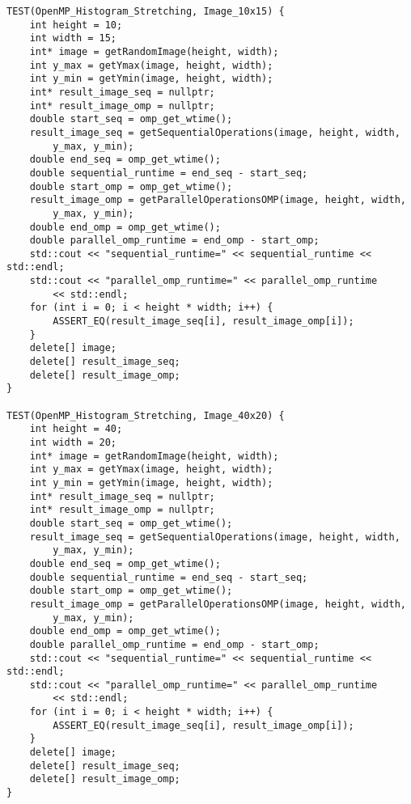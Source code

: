 \documentclass{report}
\begin{document}
\begin{lstlisting}
TEST(OpenMP_Histogram_Stretching, Image_10x15) {
    int height = 10;
    int width = 15;
    int* image = getRandomImage(height, width);
    int y_max = getYmax(image, height, width);
    int y_min = getYmin(image, height, width);
    int* result_image_seq = nullptr;
    int* result_image_omp = nullptr;
    double start_seq = omp_get_wtime();
    result_image_seq = getSequentialOperations(image, height, width,
        y_max, y_min);
    double end_seq = omp_get_wtime();
    double sequential_runtime = end_seq - start_seq;
    double start_omp = omp_get_wtime();
    result_image_omp = getParallelOperationsOMP(image, height, width,
        y_max, y_min);
    double end_omp = omp_get_wtime();
    double parallel_omp_runtime = end_omp - start_omp;
    std::cout << "sequential_runtime=" << sequential_runtime << std::endl;
    std::cout << "parallel_omp_runtime=" << parallel_omp_runtime
        << std::endl;
    for (int i = 0; i < height * width; i++) {
        ASSERT_EQ(result_image_seq[i], result_image_omp[i]);
    }
    delete[] image;
    delete[] result_image_seq;
    delete[] result_image_omp;
}

TEST(OpenMP_Histogram_Stretching, Image_40x20) {
    int height = 40;
    int width = 20;
    int* image = getRandomImage(height, width);
    int y_max = getYmax(image, height, width);
    int y_min = getYmin(image, height, width);
    int* result_image_seq = nullptr;
    int* result_image_omp = nullptr;
    double start_seq = omp_get_wtime();
    result_image_seq = getSequentialOperations(image, height, width,
        y_max, y_min);
    double end_seq = omp_get_wtime();
    double sequential_runtime = end_seq - start_seq;
    double start_omp = omp_get_wtime();
    result_image_omp = getParallelOperationsOMP(image, height, width,
        y_max, y_min);
    double end_omp = omp_get_wtime();
    double parallel_omp_runtime = end_omp - start_omp;
    std::cout << "sequential_runtime=" << sequential_runtime << std::endl;
    std::cout << "parallel_omp_runtime=" << parallel_omp_runtime
        << std::endl;
    for (int i = 0; i < height * width; i++) {
        ASSERT_EQ(result_image_seq[i], result_image_omp[i]);
    }
    delete[] image;
    delete[] result_image_seq;
    delete[] result_image_omp;
}


\end{lstlisting}
\end{document}
